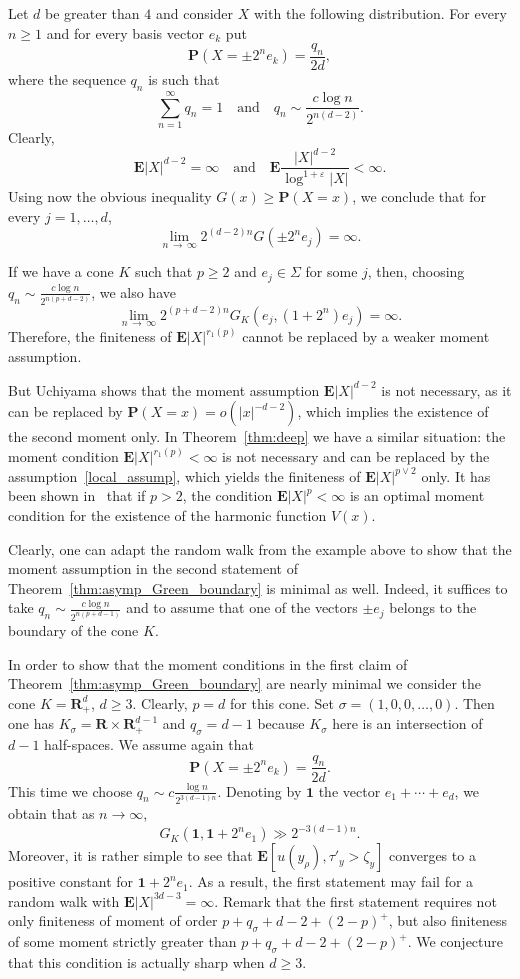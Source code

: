 \documentclass[10pt]{amsart}
\theoremstyle{definition}\newtheorem{defi}[theo]{Definition}\newtheorem{rema}[theo]{Remark}\newtheorem{exam}[theo]{Example}\newtheorem{exem}[theo]{Example}\newtheorem{nota}[theo]{Notation}
\newcommand{\pr}{\mathbf{P}}
\newcommand{\e}{\mathbf{E}}
\newcommand{\bfR}{\mathbf{R}}
\newcommand{\ind}{\mathbf{1}}
\renewcommand{\ge}{\geqslant}
\renewcommand{\geq}{\geqslant}
\begin{document}
Let $d$ be greater than $4$ and consider $X$ with the following distribution. For every $n\ge1$ and for every basis vector $e_k$ put
\[
\pr\left(X=\pm 2^n e_k\right)=\frac{q_n}{2d},
\]
where the sequence $q_n$ is such that
\[
\sum_{n=1}^\infty q_n=1\quad\text{and}\quad q_n\sim \frac{c\log n}{2^{n(d-2)}}.
\]
Clearly,
\[
\e|X|^{d-2}=\infty\quad\text{and}\quad
\e\frac{|X|^{d-2}}{\log^{1+\varepsilon}|X|}<\infty.
\]
Using now the obvious inequality $G(x)\ge\pr(X=x)$, we conclude that for every $j=1,\ldots,d$,
\[
\lim_{n\,\to\,\infty}2^{(d-2)n}G\left(\pm 2^n e_j\right)=\infty.
\]

If we have a cone $K$ such that $p\ge2$ and $e_j\in\Sigma$ for some $j$, then, choosing $q_n\sim\frac{c\log n}{2^{n(p+d-2)}}$, we also have
\[
\lim_{n\,\to\,\infty}2^{(p+d-2)n}G_{K}\left(e_j,(1+2^n)e_j\right)=\infty.
\]
Therefore, the finiteness of $\e| X|^{r_1(p)}$ cannot be replaced by a weaker moment assumption.



But Uchiyama shows that the moment assumption $\e| X|^{d-2}$ is not necessary, as it can be replaced by $\pr(X=x)=o(| x|^{-d-2})$, which implies the existence of the second moment only. In Theorem~\ref{thm:deep} we have a similar situation: the moment condition $\e| X|^{r_1(p)}<\infty$ is not necessary and can be replaced by the assumption~\eqref{local_assump}, which yields the finiteness of $\e| X|^{p\vee2}$ only. It has been shown in~\cite{DeWa-15} that if $p>2$, the condition $\e| X|^{p}<\infty$ is an optimal moment condition for the existence of the harmonic function $V(x)$.

Clearly, one can adapt the random walk from the example above to show that the moment assumption in the second statement of Theorem~\ref{thm:asymp_Green_boundary} is minimal as well. Indeed, it suffices to take $q_n\sim\frac{c\log n}{2^{n(p+d-1)}}$ and to assume that one of the vectors $\pm e_j$ belongs to the boundary of the cone $K$.

In order to show that the moment conditions in the first claim of Theorem~\ref{thm:asymp_Green_boundary} are nearly minimal we consider the cone $K=\bfR_+^d$, $d\ge3$. Clearly, $p=d$ for this cone. Set $\sigma=(1,0,0,\ldots,0)$. Then one has $K_\sigma=\bfR\times\bfR_+^{d-1}$ and $q_\sigma=d-1$ because $K_{\sigma}$ here is an intersection of $d-1$ half-spaces. We assume again that
\[
\pr\left(X=\pm 2^ne_k\right)=\frac{q_n}{2d}.
\]
This time we choose $q_n\sim c\frac{\log n}{2^{3(d-1)n}}$. Denoting by $\ind$ the vector $e_1+\cdots +e_d$, we obtain that as $n\to\infty$,
\[
G_K\left(\ind,\ind+2^ne_1\right)\gg 2^{-3(d-1)n}.
\]
Moreover, it is rather simple to see that $\e[u(y_{\rho}),\tau'_{y}>\zeta_{y}]$ converges to a positive constant for $\ind+2^ne_1$. As a result, the first statement may fail for a random walk with $\e| X|^{3d-3}=\infty$. Remark that the first statement requires not only finiteness of moment of order $p+q_{\sigma}+d-2+(2-p)^+$, but also finiteness of some moment strictly greater than $p+q_{\sigma}+d-2+(2-p)^+$. We conjecture that this condition is actually sharp when $d\geq 3$.
\end{document}
